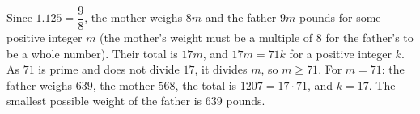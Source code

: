 Since $1.125=\dfrac98$, the mother weighs $8m$ and the father $9m$ pounds for some positive integer $m$ (the mother's weight must be a multiple of $8$ for the father's to be a whole number). Their total is $17m$, and $17m=71k$ for a positive integer $k$. As $71$ is prime and does not divide $17$, it divides $m$, so $m\ge71$. For $m=71$: the father weighs $639$, the mother $568$, the total is $1207=17\cdot71$, and $k=17$. The smallest possible weight of the father is $\boxed{639}$ pounds.
